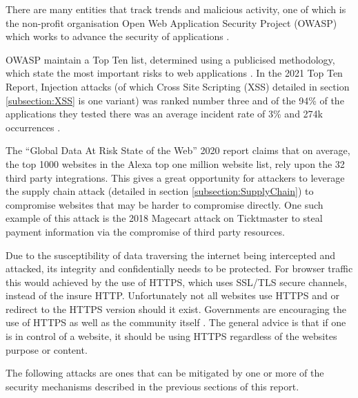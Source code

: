 \documentclass{mscreport}
\begin{document}
\vspace{0.3cm} \noindent
There are many entities that track trends and malicious activity, one of which is the non-profit organisation Open Web Application Security Project (OWASP) which works to advance the security of applications \cite{noauthor_undated-ta,Kellezi2021-nd}.

\vspace{0.3cm} \noindent
OWASP maintain a Top Ten list, determined using a publicised methodology, which state the most important risks to web applications \cite{Kellezi2021-nd,noauthor_undated-kz}. In the 2021 Top Ten Report, Injection attacks (of which Cross Site Scripting (XSS) detailed in section \ref{subsection:XSS} is one variant) was ranked number three and of the 94\% of the applications they tested there was an average incident rate of 3\% and 274k occurrences \cite{noauthor_undated-gt}.

\vspace{0.3cm} \noindent
The ``Global Data At Risk State of the Web'' 2020 report \cite{Tala_Security2020-ee} claims that on average, the top 1000 websites in the Alexa top one million website list, rely upon the 32 third party integrations. This gives a great opportunity for attackers to leverage the supply chain attack (detailed in section \ref{subsection:SupplyChain}) to compromise websites that may be harder to compromise directly. One such example of this attack is the 2018 Magecart attack on Ticktmaster \cite{Herman2019-zb} to steal payment information via the compromise of third party resources.

\vspace{0.3cm} \noindent
Due to the susceptibility of data traversing the internet being intercepted and attacked, its integrity and confidentially needs to be protected. For browser traffic this would achieved by the use of HTTPS, which uses SSL/TLS secure channels, instead of the insure HTTP. Unfortunately not all websites use HTTPS and or redirect to the HTTPS version should it exist. Governments are encouraging the use of HTTPS \cite{noauthor_undated-oz} as well as the community itself \cite{noauthor_undated-xk}. The general advice is that if one is in control of a website, it should be using HTTPS regardless of the websites purpose or content. 

\vspace{0.3cm} \noindent
The following attacks are ones that can be mitigated by one or more of the security mechanisms described in the previous sections of this report.
\end{document}
